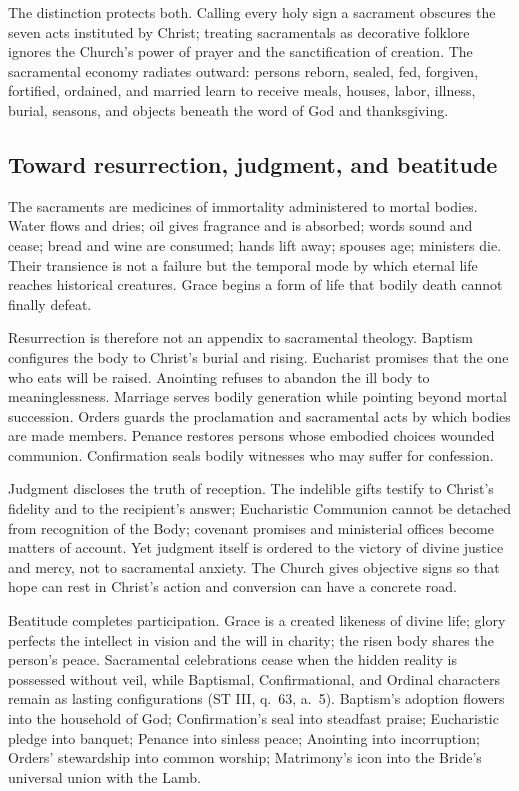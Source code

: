 The distinction protects both. Calling every holy sign a sacrament obscures the seven acts instituted by Christ; treating sacramentals as decorative folklore ignores the Church's power of prayer and the sanctification of creation. The sacramental economy radiates outward: persons reborn, sealed, fed, forgiven, fortified, ordained, and married learn to receive meals, houses, labor, illness, burial, seasons, and objects beneath the word of God and thanksgiving.

\subsection{Toward resurrection, judgment, and beatitude}

The sacraments are medicines of immortality administered to mortal bodies. Water flows and dries; oil gives fragrance and is absorbed; words sound and cease; bread and wine are consumed; hands lift away; spouses age; ministers die. Their transience is not a failure but the temporal mode by which eternal life reaches historical creatures. Grace begins a form of life that bodily death cannot finally defeat.

Resurrection is therefore not an appendix to sacramental theology. Baptism configures the body to Christ's burial and rising. Eucharist promises that the one who eats will be raised. Anointing refuses to abandon the ill body to meaninglessness. Marriage serves bodily generation while pointing beyond mortal succession. Orders guards the proclamation and sacramental acts by which bodies are made members. Penance restores persons whose embodied choices wounded communion. Confirmation seals bodily witnesses who may suffer for confession.

Judgment discloses the truth of reception. The indelible gifts testify to Christ's fidelity and to the recipient's answer; Eucharistic Communion cannot be detached from recognition of the Body; covenant promises and ministerial offices become matters of account. Yet judgment itself is ordered to the victory of divine justice and mercy, not to sacramental anxiety. The Church gives objective signs so that hope can rest in Christ's action and conversion can have a concrete road.

Beatitude completes participation. Grace is a created likeness of divine life; glory perfects the intellect in vision and the will in charity; the risen body shares the person's peace. Sacramental celebrations cease when the hidden reality is possessed without veil, while Baptismal, Confirmational, and Ordinal characters remain as lasting configurations (ST III, q.~63, a.~5). Baptism's adoption flowers into the household of God; Confirmation's seal into steadfast praise; Eucharistic pledge into banquet; Penance into sinless peace; Anointing into incorruption; Orders' stewardship into common worship; Matrimony's icon into the Bride's universal union with the Lamb.


